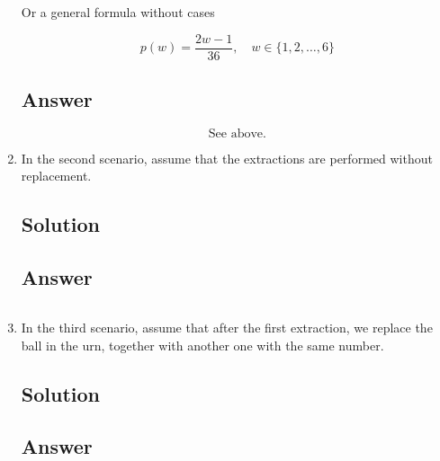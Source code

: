 \documentclass[12pt]{article}
\begin{document}
\begin{enumerate}[start=1,label={\bfseries Part \arabic*:},leftmargin=0in]
			Or a general formula without cases
			
			\[p(w) = \frac{2w-1}{36},\quad w\in \{1,2,\dots,6\}\]
		
		\subsection*{Answer}
		
			\[\boxed{\text{See above.}}\]
		
		\bigskip\item In the second scenario, assume that the extractions are performed without replacement.
		
		\subsection*{Solution}
		
		\subsection*{Answer}
		
			\[\boxed{}\]
			
		\bigskip\item In the third scenario, assume that after the first extraction, we replace the ball in the urn, together with another one with the same number.
		
		\subsection*{Solution}
		
		\subsection*{Answer}
		
			\[\boxed{}\]
	\end{enumerate}
	
\end{document}
